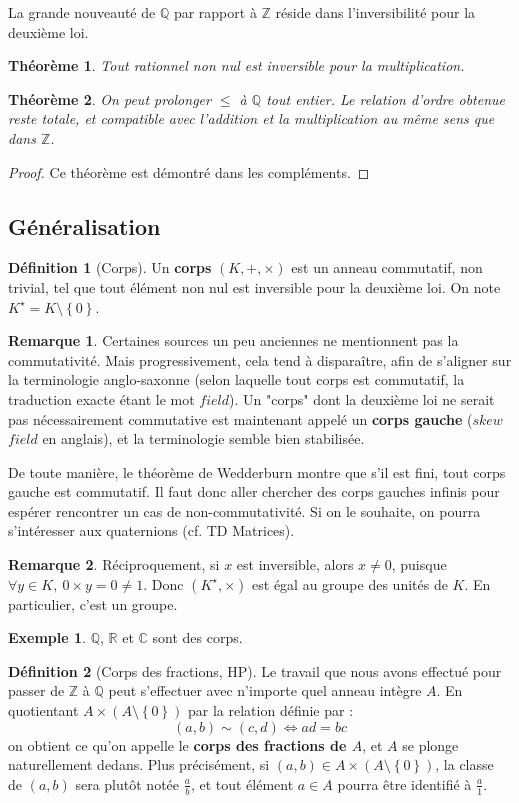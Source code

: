 \documentclass[french]{book}
\newcommand{\Z}{\mathbb{Z}}
\newcommand{\Q}{\mathbb{Q}}
\newcommand{\R}{\mathbb{R}}
\newcommand{\C}{\mathbb{C}}
\newcommand{\st}{^\star}
\theoremstyle{plain}
\newtheorem{thm}{Théorème}[chapter]
\theoremstyle{definition}
\newtheorem{dfn}{Définition}[chapter]
\newtheorem{exa}{Exemple}[chapter]
\newtheorem{rmq}{Remarque}[chapter]
\theoremstyle{remark}
\begin{document}
La grande nouveauté de $\Q$ par rapport à $\Z$ réside dans l'inversibilité pour la deuxième loi.
\begin{thm}
	Tout rationnel non nul est inversible pour la multiplication.
\end{thm}
\begin{thm}
	On peut prolonger $\leqslant$ à $\Q$ tout entier. Le relation d'ordre obtenue reste totale, et compatible avec l'addition et la multiplication au même sens que dans $\Z$.
\end{thm}
\begin{proof}
	Ce théorème est démontré dans les compléments.
\end{proof}
\subsection{Généralisation}
\begin{dfn}[Corps]
	Un \textbf{corps} $(K,+,\times)$ est un anneau commutatif, non trivial, tel que tout élément non nul est inversible pour la deuxième loi. On note $K\st=K\setminus\left\{0\right\}$.
\end{dfn}
\begin{rmq}
	Certaines sources un peu anciennes ne mentionnent pas la commutativité. Mais progressivement, cela tend à disparaître, afin de s'aligner sur la terminologie anglo-saxonne (selon laquelle tout corps est commutatif, la traduction exacte étant le mot $field$). Un "corps" dont la deuxième loi ne serait pas nécessairement commutative est maintenant appelé un \textbf{corps gauche} ($skew$ $field$ en anglais), et la terminologie semble bien stabilisée.
	\par De toute manière, le théorème de Wedderburn montre que s'il est fini, tout corps gauche est commutatif. Il faut donc aller chercher des corps gauches infinis pour espérer rencontrer un cas de non-commutativité. Si on le souhaite, on pourra s'intéresser aux quaternions (cf. TD Matrices).
\end{rmq}
\begin{rmq}
	Réciproquement, si $x$ est inversible, alors $x\ne0$, puisque $\forall y\in K,\ 0\times y=0\ne1$. Donc $(K\st,\times)$ est égal au groupe des unités de $K$. En particulier, c'est un groupe.
\end{rmq}
\begin{exa}
	$\Q$, $\R$ et $\C$ sont des corps.
\end{exa}
\begin{dfn}[Corps des fractions, HP]
	Le travail que nous avons effectué pour passer de $\Z$ à $\Q$ peut s'effectuer avec n'importe quel anneau intègre $A$. En quotientant $A\times (A\setminus\left\{0\right\})$ par la relation définie par : $$(a,b)\sim(c,d)\iff ad=bc$$ on obtient ce qu'on appelle le \textbf{corps des fractions de $A$}, et $A$ se plonge naturellement dedans. Plus précisément, si $(a,b)\in A\times (A\setminus\left\{0\right\})$, la classe de $(a,b)$ sera plutôt notée $\displaystyle\frac{a}{b}$, et tout élément $a\in A$ pourra être identifié à $\displaystyle\frac{a}{1}$.
\end{dfn}
\end{document}

